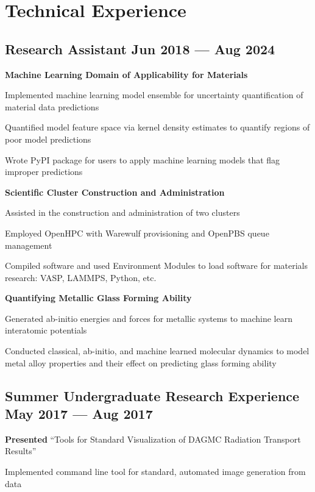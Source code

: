 \section{Technical Experience}

\subsection{{Research Assistant \hfill Jun 2018 --- Aug 2024}}
\begin{zitemize}
\item[] \textbf{Machine Learning Domain of Applicability for Materials}
    \begin{zitemize}
    \item Implemented machine learning model ensemble for uncertainty quantification of material data predictions
    \item Quantified model feature space via kernel density estimates to quantify regions of poor model predictions
    \item Wrote PyPI package for users to apply machine learning models that flag improper predictions
    \end{zitemize}
\item[] \textbf{Scientific Cluster Construction and Administration}
    \begin{zitemize}
    \item Assisted in the construction and administration of two clusters
    \item Employed OpenHPC with Warewulf provisioning and OpenPBS queue management
    \item Compiled software and used Environment Modules to load software for materials research: VASP, LAMMPS, Python, etc.
    \end{zitemize}
\item[] \textbf{Quantifying Metallic Glass Forming Ability}
    \begin{zitemize}
    \item Generated ab-initio energies and forces for metallic systems to machine learn interatomic potentials
    \item Conducted classical, ab-initio, and machine learned molecular dynamics to model metal alloy properties and their effect on predicting glass forming ability
    \end{zitemize}
\end{zitemize}

\subsection{{Summer Undergraduate Research Experience \hfill May 2017 --- Aug 2017}}
\begin{zitemize}
\item \textbf{Presented} ``Tools for Standard Visualization of DAGMC Radiation Transport Results''
\item Implemented command line tool for standard, automated image generation from data
\end{zitemize}

